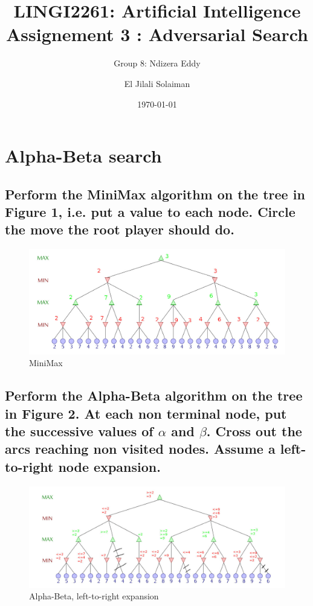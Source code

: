 \documentclass[10pt,a4paper]{article}
\begin{document}
\title{LINGI2261: Artificial Intelligence \\
Assignement 3 : Adversarial Search}
\author{Group 8: Ndizera Eddy \and El Jilali Solaiman}
\date{\today}
\maketitle

\section{Alpha-Beta search}

\subsection{Perform the MiniMax algorithm on the tree in Figure 1, i.e. put a value to each node. Circle the move the root player should do.}

\begin{figure}[h]
\includegraphics[scale=0.4]{img/minimax.jpg} 
\caption{\label{minimax} MiniMax}
\end{figure}

\subsection{Perform the Alpha-Beta algorithm on the tree in Figure 2. At each non terminal node, put the successive values of $ \alpha $ and $ \beta $. Cross out the arcs reaching non visited nodes. Assume a left-to-right node expansion.}

\begin{figure}[h]
\includegraphics[scale=0.4]{img/alphabeta_left.jpg} 
\caption{\label{alphabetaleft} Alpha-Beta, left-to-right expansion}
\end{figure}
\end{document}
